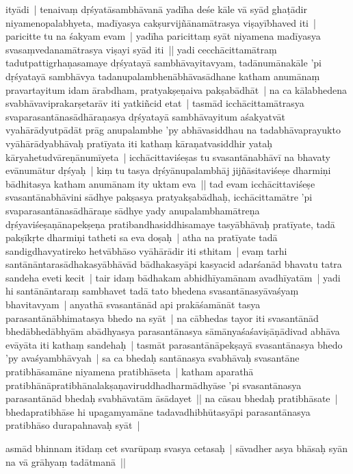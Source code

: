 \documentclass[article,12pt,a4paper]{memoir}%
\newcounter{parCount}
\begin{document}
	  
	  \pstart \leavevmode%
	ityādi | tenaivaṃ dṛśyatāsambhāvanā yadīha deśe kāle vā syād ghaṭādir niyamenopalabhyeta, madīyasya cakṣurvijñānamātrasya viṣayībhaved iti | paricitte tu na śakyam evam | yadīha paricittaṃ syāt niyamena madīyasya svasaṃvedanamātrasya viṣayi syād iti || \label{thakur75-146.26} yadi cecchācittamātraṃ tadutpattigrhaṇasamaye dṛśyatayā sambhāvayitavyam, tadānumānakāle 'pi dṛśyatayā sambhāvya tadanupalambhenābhāvasādhane katham anumānaṃ pravartayitum idam ārabdham, pratyakṣeṇaiva pakṣabādhāt | na ca kālabhedena svabhāvaviprakarṣetarāv iti yatkiñcid etat | tasmād icchācittamātrasya svaparasantānasādhāraṇasya dṛśyatayā sambhāvayitum aśakyatvāt vyahārādyutpādāt prāg anupalambhe 'py abhāvasiddhau na tadabhāvaprayukto vyāhārādyabhāvaḥ pratīyata iti kathaṃ kāraṇatvasiddhir yataḥ kāryahetudvāreṇānumīyeta | icchācittaviśeṣas tu svasantānabhāvī na bhavaty evānumātur dṛśyaḥ | kiṃ tu tasya dṛśyānupalambhāj jijñāsitaviśeṣe dharmiṇi bādhitasya katham anumānam ity uktam eva || \label{thakur75-147.1} tad evam icchācittaviśeṣe svasantānabhāvini sādhye pakṣasya pratyakṣabādhaḥ, icchācittamātre 'pi svaparasantānasādhāraṇe sādhye yady anupalambhamātreṇa dṛśyaviśeṣaṇānapekṣeṇa pratibandhasiddhisamaye tasyābhāvaḥ pratīyate, tadā pakṣīkṛte dharmiṇi tatheti sa eva doṣaḥ | atha na pratīyate tadā sandigdhavyatireko hetvābhāso vyāhārādir iti sthitam | \label{thakur75-147.6} evaṃ tarhi santānāntarasādhakasyābhāvād bādhakasyāpi kasyacid adarśanād bhavatu tatra sandeha eveti kecit | tair idaṃ bādhakam abhidhīyamānam avadhīyatām | yadi hi santānāntaraṃ sambhavet tadā tato bhedena svasantānasyāvaśyaṃ bhavitavyam | anyathā svasantānād api prakāśamānāt tasya parasantānābhimatasya bhedo na syāt | na cābhedas tayor iti svasantānād bhedābhedābhyām abādhyasya parasantānasya sāmānyaśaśaviṣāṇādivad abhāva evāyāta iti kathaṃ sandehaḥ | tasmāt parasantānāpekṣayā svasantānasya bhedo 'py avaśyambhāvyah | sa ca bhedaḥ santānasya svabhāvaḥ svasantāne pratibhāsamāne niyamena pratibhāseta | katham aparathā pratibhānāpratibhānalakṣaṇaviruddhadharmādhyāse 'pi svasantānasya parasantānād bhedaḥ svabhāvatām āsādayet || \label{thakur75-147.15} na cāsau bhedaḥ pratibhāsate | bhedapratibhāse hi upagamyamāne tadavadhibhūtasyāpi parasantānasya pratibhāso durapahnavaḥ syāt |
	{}
	\pend%
      

	  
	  \pstart \leavevmode%
	asmād bhinnam itīdaṃ cet svarūpaṃ svasya cetasaḥ | sāvadher asya bhāsaḥ syān na vā grāhyaṃ tadātmanā || 
	{}
	\pend%
      
\end{document}
